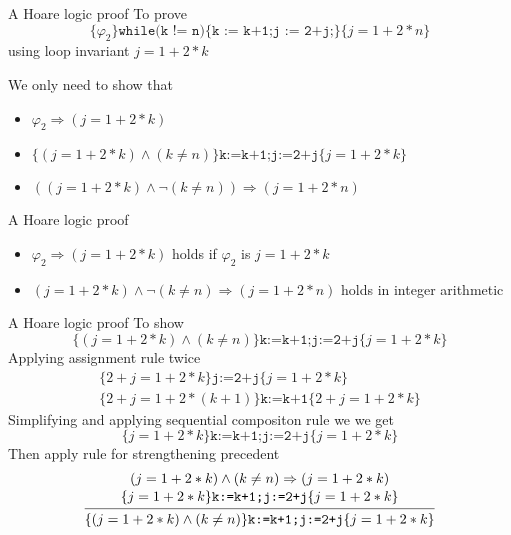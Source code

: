 \documentclass[presentation]{beamer}
\begin{document}
\begin{frame}[label={sec:orgb4d1501}]{A Hoare logic proof}
To prove
\begin{equation*}
\{\varphi_2\}\texttt{while(k != n)\{k := k+1;j := 2+j;\}}\{j=1+2*n\}
\end{equation*}
using loop invariant \(j=1+2*k\)

We only need to show that
\begin{itemize}
\item \(\varphi_2\Rightarrow(j=1+2*k)\)
\item \(\{(j=1+2*k)\wedge(k\neq n)\}\texttt{k:=k+1;j:=2+j}\{j=1+2*k\}\)
\item \(((j=1+2*k)\wedge\neg(k\neq n))\Rightarrow(j=1+2*n)\)
\end{itemize}
\end{frame}
\begin{frame}[label={sec:org09e7061}]{A Hoare logic proof}
\begin{itemize}
\item \(\varphi_2\Rightarrow(j=1+2*k)\) holds if \(\varphi_2\) is \(j=1+2*k\)
\item \((j=1+2*k)\wedge\neg(k\neq n)\Rightarrow(j=1+2*n)\) holds in integer arithmetic
\end{itemize}
\end{frame}
\begin{frame}[label={sec:orgc5d1c93}]{A Hoare logic proof}
To show
\begin{equation*}
\{(j=1+2*k)\wedge(k\neq n)\}\texttt{k:=k+1;j:=2+j}\{j=1+2*k\}
\end{equation*}
Applying assignment rule twice
\begin{gather*}
\{2+j=1+2*k\}\texttt{j:=2+j}\{j=1+2*k\}\\
\{2+j=1+2*(k+1)\}\texttt{k:=k+1}\{2+j=1+2*k\}
\end{gather*}
Simplifying and applying sequential compositon rule we we get
\begin{equation*}
\{j=1+2*k\}\texttt{k:=k+1;j:=2+j}\{j=1+2*k\}
\end{equation*}
Then apply rule for strengthening precedent
\begin{equation*}
\begin{prooftree}%
\hypo{(j=1+2*k)\wedge(k\neq n)\Rightarrow(j=1+2*k)}
\infer[no rule]1{\{j=1+2*k\}\texttt{k:=k+1;j:=2+j}\{j=1+2*k\}}
\infer1{\{(j=1+2*k)\wedge(k\neq n)\}\texttt{k:=k+1;j:=2+j}\{j=1+2*k\}}
\end{prooftree}
\end{equation*}
\end{frame}
\end{document}
